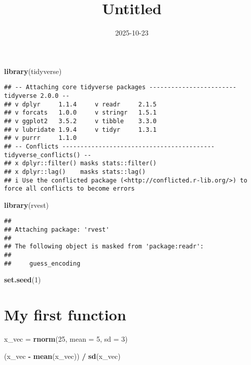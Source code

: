 \documentclass[
]{article}
\title{Untitled}
\author{}
\date{\vspace{-2.5em}2025-10-23}
\newenvironment{Shaded}{\begin{snugshade}}{\end{snugshade}}
\newcommand{\AttributeTok}[1]{\textcolor[rgb]{0.13,0.29,0.53}{#1}}
\newcommand{\DecValTok}[1]{\textcolor[rgb]{0.00,0.00,0.81}{#1}}
\newcommand{\FunctionTok}[1]{\textcolor[rgb]{0.13,0.29,0.53}{\textbf{#1}}}
\newcommand{\NormalTok}[1]{#1}
\newcommand{\OtherTok}[1]{\textcolor[rgb]{0.56,0.35,0.01}{#1}}
\newcommand{\SpecialCharTok}[1]{\textcolor[rgb]{0.81,0.36,0.00}{\textbf{#1}}}
\begin{document}
\maketitle

\begin{Shaded}
\begin{Highlighting}[]
\FunctionTok{library}\NormalTok{(tidyverse)}
\end{Highlighting}
\end{Shaded}

\begin{verbatim}
## -- Attaching core tidyverse packages ------------------------ tidyverse 2.0.0 --
## v dplyr     1.1.4     v readr     2.1.5
## v forcats   1.0.0     v stringr   1.5.1
## v ggplot2   3.5.2     v tibble    3.3.0
## v lubridate 1.9.4     v tidyr     1.3.1
## v purrr     1.1.0     
## -- Conflicts ------------------------------------------ tidyverse_conflicts() --
## x dplyr::filter() masks stats::filter()
## x dplyr::lag()    masks stats::lag()
## i Use the conflicted package (<http://conflicted.r-lib.org/>) to force all conflicts to become errors
\end{verbatim}

\begin{Shaded}
\begin{Highlighting}[]
\FunctionTok{library}\NormalTok{(rvest)}
\end{Highlighting}
\end{Shaded}

\begin{verbatim}
## 
## Attaching package: 'rvest'
## 
## The following object is masked from 'package:readr':
## 
##     guess_encoding
\end{verbatim}

\begin{Shaded}
\begin{Highlighting}[]
\FunctionTok{set.seed}\NormalTok{(}\DecValTok{1}\NormalTok{)}
\end{Highlighting}
\end{Shaded}

\section{My first function}\label{my-first-function}

\begin{Shaded}
\begin{Highlighting}[]
\NormalTok{x\_vec }\OtherTok{=} \FunctionTok{rnorm}\NormalTok{(}\DecValTok{25}\NormalTok{, }\AttributeTok{mean =} \DecValTok{5}\NormalTok{, }\AttributeTok{sd =} \DecValTok{3}\NormalTok{)}

\NormalTok{(x\_vec }\SpecialCharTok{{-}} \FunctionTok{mean}\NormalTok{(x\_vec)) }\SpecialCharTok{/} \FunctionTok{sd}\NormalTok{(x\_vec)}
\end{Highlighting}
\end{Shaded}
\end{document}
